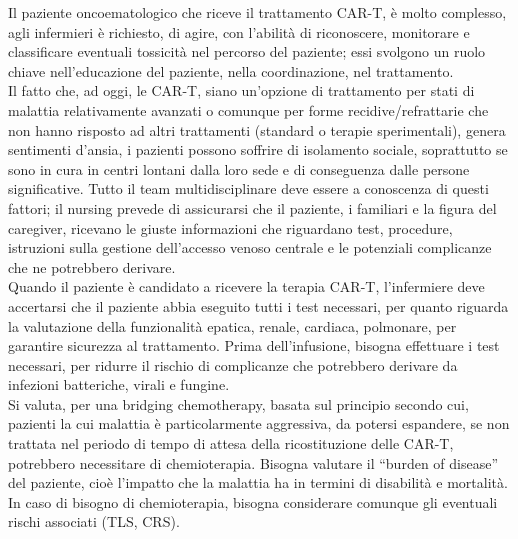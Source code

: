 Il paziente oncoematologico che riceve il trattamento CAR-T, è molto complesso, agli infermieri è richiesto, 
di agire, con l’abilità di riconoscere, monitorare e classificare eventuali tossicità nel 
percorso del paziente; essi svolgono un ruolo chiave nell’educazione del paziente, nella coordinazione, 
nel trattamento\cite{NURSINGCART}.\\
Il fatto che, ad oggi, le CAR-T, siano un’opzione di trattamento per stati di malattia relativamente avanzati o comunque 
per forme recidive/refrattarie che non hanno risposto ad altri trattamenti (standard o terapie sperimentali), 
genera sentimenti d’ansia, i pazienti possono soffrire di isolamento sociale, soprattutto se sono in cura in centri 
lontani dalla loro sede e di conseguenza dalle persone significative. Tutto il team multidisciplinare deve essere a 
conoscenza di questi fattori; il nursing prevede di assicurarsi che il paziente, i familiari e la figura del caregiver, 
ricevano le giuste informazioni che riguardano test, procedure, istruzioni sulla gestione dell’accesso 
venoso centrale e le potenziali complicanze che ne potrebbero derivare\cite{NURSINGCART}.\\

Quando il paziente è candidato a ricevere la terapia CAR-T, l’infermiere deve accertarsi che il paziente abbia eseguito 
tutti i test necessari, per quanto riguarda la valutazione della funzionalità epatica, 
renale, cardiaca, polmonare, per garantire sicurezza al trattamento\cite{article2}. Prima dell’infusione, 
bisogna effettuare i test necessari, per ridurre il rischio di complicanze che potrebbero derivare 
da infezioni batteriche, virali e fungine\cite{NURSINGCART}.\\
Si valuta, per una bridging chemotherapy, basata sul principio secondo cui, pazienti la cui malattia è particolarmente 
aggressiva, da potersi espandere, se non trattata nel periodo di tempo di attesa della ricostituzione delle CAR-T, 
potrebbero necessitare di chemioterapia. Bisogna valutare il “burden of disease” del paziente, cioè l’impatto che 
la malattia ha in termini di disabilità e mortalità. 
In caso di bisogno di chemioterapia, bisogna considerare comunque gli eventuali rischi associati (TLS, CRS)\cite{article3}.\\

